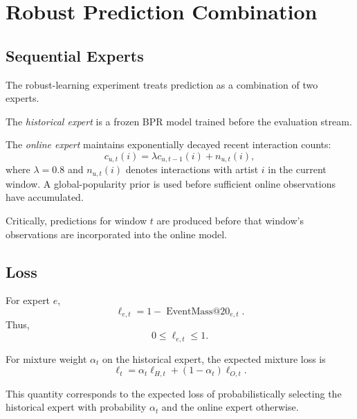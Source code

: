 \documentclass[11pt]{article}
\begin{document}

\section{Robust Prediction Combination}

\subsection{Sequential Experts}

The robust-learning experiment treats prediction as a combination of
two experts.

The \emph{historical expert} is a frozen BPR model trained before the
evaluation stream.

The \emph{online expert} maintains exponentially decayed recent
interaction counts:
%
\begin{equation}
    c_{u,t}(i)
    =
    \lambda
    c_{u,t-1}(i)
    +
    n_{u,t}(i),
\end{equation}
%
where $\lambda=0.8$ and $n_{u,t}(i)$ denotes interactions with artist
$i$ in the current window. A global-popularity prior is used before
sufficient online observations have accumulated.

Critically, predictions for window $t$ are produced before that
window's observations are incorporated into the online model.

\subsection{Loss}

For expert $e$,
%
\begin{equation}
    \ell_{e,t}
    =
    1
    -
    \operatorname{EventMass@20}_{e,t}.
\end{equation}
%
Thus,
%
\begin{equation}
    0 \leq \ell_{e,t} \leq 1.
\end{equation}

For mixture weight $\alpha_t$ on the historical expert, the expected
mixture loss is
%
\begin{equation}
    \ell_t
    =
    \alpha_t
    \ell_{H,t}
    +
    (1-\alpha_t)
    \ell_{O,t}.
\end{equation}

This quantity corresponds to the expected loss of probabilistically
selecting the historical expert with probability $\alpha_t$ and the
online expert otherwise.
\end{document}
